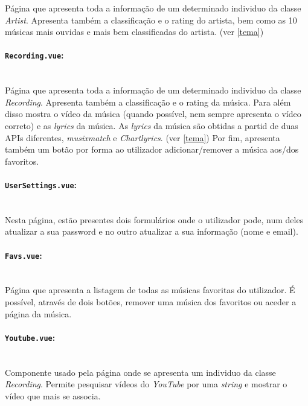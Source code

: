 \documentclass{article}
\begin{document}
Página que apresenta toda a informação de um determinado individuo da classe \textit{Artist}. Apresenta também a classificação e o rating do artista, bem como as 10 músicas mais ouvidas e mais bem classificadas do artista. (ver \ref{tema})

\paragraph{\texttt{Recording.vue}:}\mbox{}\\

Página que apresenta toda a informação de um determinado individuo da classe \textit{Recording}. Apresenta também a classificação e o rating da música. Para além disso mostra o vídeo da música (quando possível, nem sempre apresenta o vídeo correto) e as \textit{lyrics} da música. As \textit{lyrics} da música são obtidas a partid de duas APIs diferentes, \textit{musixmatch} e \textit{Chartlyrics}. (ver \ref{tema}) Por fim, apresenta também um botão por forma ao utilizador adicionar/remover a música aos/dos favoritos.

\paragraph{\texttt{UserSettings.vue}:}\mbox{}\\

Nesta página, estão presentes dois formulários onde o utilizador pode, num deles atualizar a sua password e no outro atualizar a sua informação (nome e email).

\paragraph{\texttt{Favs.vue}:}\mbox{}\\

Página que apresenta a listagem de todas as músicas favoritas do utilizador. É possível, através de dois botões, remover uma música dos favoritos ou aceder a página da música.

\paragraph{\texttt{Youtube.vue}:}\mbox{}\\

Componente usado pela página onde se apresenta um individuo da classe \textit{Recording}. Permite pesquisar vídeos do \textit{YouTube} por uma \textit{string} e mostrar o vídeo que mais se associa.
\end{document}
